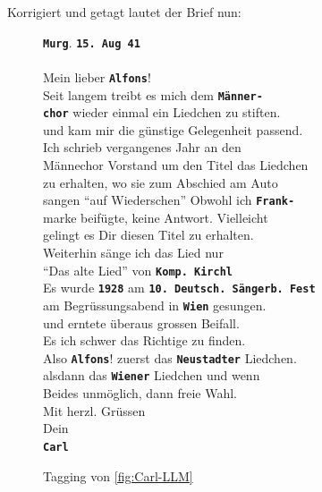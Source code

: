 \documentclass[12pt, a4paper, ngerman, bidi=default]{article}
\begin{document}
Korrigiert und getagt lautet der Brief nun:
  \begin{figure}[htbp]
  \centering
\begin{tcolorbox}[colback=oldLetter, colframe=black, sharp corners, width=\textwidth]
  \textbf{\colorbox{place}{\texttt{Murg}}}.  \textbf{\colorbox{date}{\texttt{15. Aug 41}}} \\
\\
Mein lieber  \textbf{\colorbox{person}{\texttt{Alfons}}}!\\
Seit langem treibt es mich dem  \textbf{\colorbox{organization}{\texttt{Männer-}}}\\
\textbf{\colorbox{organization}{\texttt{chor}}} wieder einmal ein Liedchen zu stiften.\\
und kam mir die günstige Gelegenheit passend.\\
Ich schrieb vergangenes Jahr an den\\
Männechor Vorstand um den Titel das Liedchen\\
zu erhalten, wo sie zum Abschied am Auto \\
sangen \enquote{auf Wiederschen} Obwohl ich  \textbf{\colorbox{unclear}{\texttt{Frank-}}}\\
marke beifügte, keine Antwort. Vielleicht\\
gelingt es Dir diesen Titel zu erhalten.\\
Weiterhin sänge ich das Lied nur\\
\enquote{Das alte Lied} von  \textbf{\colorbox{abbrev}{\texttt{Komp.}}}\textbf{\colorbox{person}{\texttt{ Kirchl}}}\\
Es wurde \textbf{\colorbox{date}{\texttt{1928}}} am \textbf{\colorbox{eventTag}{\texttt{10. Deutsch. Sängerb. Fest}}}\\
am Begrüssungsabend in \textbf{\colorbox{place}{\texttt{Wien}}} gesungen.\\
und erntete überaus grossen Beifall.\\
Es ich schwer das Richtige zu finden.\\
Also \textbf{\colorbox{person}{\texttt{Alfons}}}! zuerst das \textbf{\colorbox{place}{\texttt{Neustadter}}} Liedchen.\\
alsdann das \textbf{\colorbox{place}{\texttt{Wiener}}} Liedchen und wenn\\
Beides unmöglich, dann freie Wahl.\\
Mit herzl. Grüssen \\
Dein\\
\textbf{\colorbox{person}{\texttt{Carl}}}\\
\end{tcolorbox}
\caption{Tagging von \autoref{fig:Carl-LLM}}\label{fig:Tagging-Carl-LLM}
\end{figure}
\end{document}
